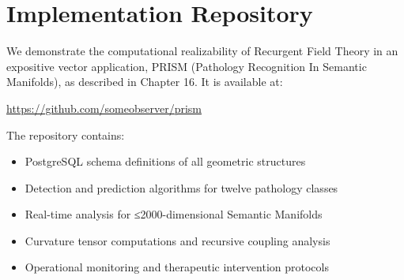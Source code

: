 \documentclass[11pt, a4paper]{report}
\begin{document}
\tableofcontents


















\appendix
\chapter{Implementation Repository}
\label{appendix:implementation}

We demonstrate the computational realizability of Recurgent Field Theory in an expositive vector application, PRISM (Pathology Recognition In Semantic Manifolds), as described in Chapter 16. It is available at:

\begin{center}
\url{https://github.com/someobserver/prism}
\end{center}

The repository contains:
\begin{itemize}
\item PostgreSQL schema definitions of all geometric structures
\item Detection and prediction algorithms for twelve pathology classes
\item Real-time analysis for ≤2000-dimensional Semantic Manifolds
\item Curvature tensor computations and recursive coupling analysis
\item Operational monitoring and therapeutic intervention protocols
\end{itemize}

\end{document}
